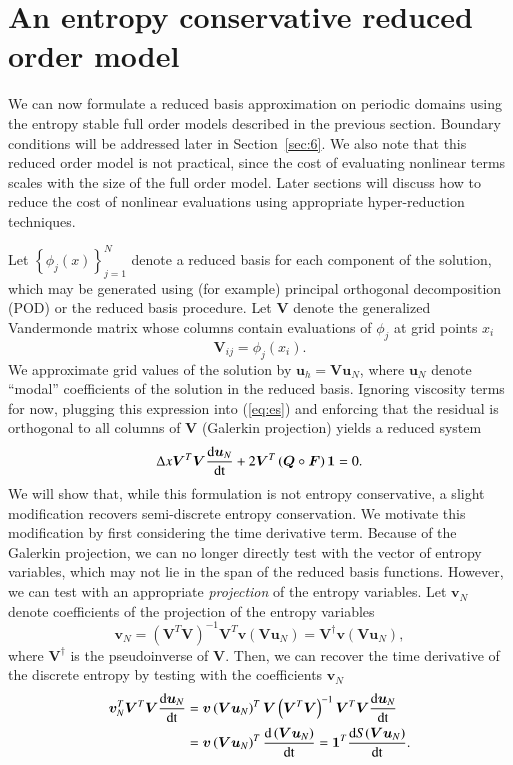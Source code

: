 \documentclass[preprint,10pt]{elsarticle}
\theoremstyle{definition}
\theoremstyle{lemma}
\theoremstyle{theorem}
\theoremstyle{assumption}
\newcommand{\td}[2]{\frac{{\rm d}#1}{{\rm d}{\rm #2}}}
\newcommand{\LRp}[1]{\left( #1 \right)}
\newcommand{\LRc}[1]{\left\{ #1 \right\}}
\begin{document}
\section{An entropy conservative reduced order model}
\label{sec:3}
We can now formulate a reduced basis approximation on periodic domains using the entropy stable full order models described in the previous section.  Boundary conditions will be addressed later in Section~\ref{sec:6}.  We also note that this reduced order model is not practical, since the cost of evaluating nonlinear terms scales with the size of the full order model.  Later sections will discuss how to reduce the cost of nonlinear evaluations using appropriate hyper-reduction techniques.

Let $\LRc{{\phi}_j(x)}_{j=1}^{N}$ denote a reduced basis for each component of the solution, which may be generated using (for example) principal orthogonal decomposition (POD) or the reduced basis procedure.  Let $\bm{V}$ denote the generalized Vandermonde matrix whose columns contain evaluations of $\phi_j$ at grid points $x_i$
\[
\bm{V}_{ij} = {\phi}_j(x_i).
\]
We approximate grid values of the solution by $\bm{u}_h = \bm{V}\bm{u}_N$, where $\bm{u}_N$ denote ``modal'' coefficients  of the solution in the reduced basis.  Ignoring viscosity terms for now, plugging this expression into (\ref{eq:es}) and enforcing that the residual is orthogonal to all columns of $\bm{V}$ (Galerkin projection) yields a reduced system
\begin{align*}
\Delta x\bm{V}^T\bm{V}\td{\bm{u}_N}{t} + 2\bm{V}^T\LRp{\bm{Q}\circ \bm{F}}\bm{1} = 0.
\end{align*}
We will show that, while this formulation is not entropy conservative, a slight modification recovers semi-discrete entropy conservation.  We motivate this modification by first considering the time derivative term.  Because of the Galerkin projection, we can no longer directly test with the vector of entropy variables, which may not lie  in the span of the reduced basis functions.  However, we can test with an appropriate \textit{projection} of the entropy variables.  Let $\bm{v}_N$ denote coefficients of the projection of the entropy variables
\[
\bm{v}_N = \LRp{\bm{V}^T\bm{V}}^{-1}\bm{V}^T \bm{v}\LRp{\bm{V}\bm{u}_N} = \bm{V}^{\dagger} \bm{v}\LRp{\bm{V}\bm{u}_N},
\]
where $\bm{V}^{\dagger}$ is the pseudoinverse of $\bm{V}$.  Then, we can recover the time derivative of the discrete entropy by testing with the coefficients $\bm{v}_N$
\begin{align}
\bm{v}_N^T\bm{V}^T\bm{V}\td{\bm{u}_N}{t} &= \bm{v}\LRp{\bm{V}\bm{u}_N}^T \bm{V}\LRp{\bm{V}^T\bm{V}}^{-1}\bm{V}^T\bm{V} \td{\bm{u}_N}{t} \label{eq:esromtime}\\
&= 
 \bm{v}\LRp{\bm{V}\bm{u}_N}^T \td{\LRp{\bm{V}\bm{u}_N}}{t} = \bm{1}^T\td{S(\bm{V}\bm{u}_N)}{t}.\nonumber
\end{align}
\end{document}
